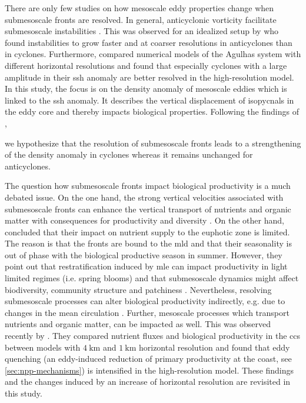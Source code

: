 There are only few studies on how mesoscale eddy properties change when submesoscale fronts are resolved. In general, anticyclonic vorticity facilitate submesoscale instabilities \autocite{haine-1998-mli, mcwilliams-2004-aai, thomas-2013-classification-sym-inst}. This was observed for an idealized setup by \textcite{brannigan-2017} who found instabilities to grow faster and at coarser resolutions in anticyclones than in cyclones. Furthermore, \textcite{schubert-2019-agulhas} compared numerical models of the Agulhas system with different horizontal resolutions and found that especially cyclones with a large amplitude in their \ac{ssh} anomaly are better resolved in the high-resolution model. In this study, the focus is on the density anomaly of mesoscale eddies which is linked to the \ac{ssh} anomaly. It describes the vertical displacement of isopycnals in the eddy core and thereby impacts biological properties. Following the findings of \textcite{schubert-2019-agulhas},

\begin{hypothesis}
we hypothesize that the resolution of submesoscale fronts leads to a strengthening of the density anomaly in cyclones whereas it remains unchanged for anticyclones.\label{hypo:h2}
\end{hypothesis}

The question how submesoscale fronts impact biological productivity is a much debated issue. On the one hand, the strong vertical velocities associated with submesoscale fronts can enhance the vertical transport of nutrients and organic matter with consequences for productivity and diversity \autocite{levy-2018-role-structuring, whitt-2019-subm-flux-storm}. On the other hand, \textcite{levy-2018-role-structuring} concluded that their impact on nutrient supply to the euphotic zone is limited. The reason is that the fronts are bound to the \ac{mld} and that their seasonality is out of phase with the biological productive season in summer. However, they point out that restratification induced by \ac{mle} can impact productivity in light limited regimes (i.e. spring blooms) and that submesoscale dynamics might affect biodiversity, community structure and patchiness \autocite{levy-2018-role-structuring}. Nevertheless, resolving submesoscale processes can alter biological productivity indirectly, e.g. due to changes in the mean circulation \autocite{levy-2012-large-scale-impacts}. Further, mesoscale processes which transport nutrients and organic matter, can be impacted as well. This was observed recently by \textcite{kessouri-2020-seasonal-prod}. They compared nutrient fluxes and biological productivity in the \ac{ccs} between models with $\SI{4}{\kilo\metre}$ and $\SI{1}{\kilo\metre}$ horizontal resolution and found that eddy quenching (an eddy-induced reduction of primary productivity at the coast, see \autoref{sec:npp-mechanisms}) is intensified in the high-resolution model. These findings and the changes induced by an increase of horizontal resolution are revisited in this study.

